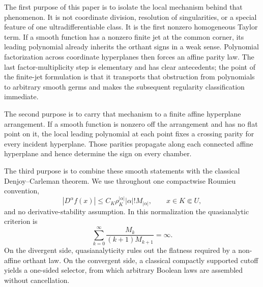 \documentclass[11pt]{article}
\theoremstyle{definition}
\theoremstyle{remark}
\begin{document}
The first purpose of this paper is to isolate the local mechanism behind that phenomenon. It is not coordinate division, resolution of singularities, or a special feature of one ultradifferentiable class. It is the first nonzero homogeneous Taylor term. If a smooth function has a nonzero finite jet at the common corner, its leading polynomial already inherits the orthant signs in a weak sense. Polynomial factorization across coordinate hyperplanes then forces an affine parity law. The last factor-multiplicity step is elementary and has clear antecedents; the point of the finite-jet formulation is that it transports that obstruction from polynomials to arbitrary smooth germs and makes the subsequent regularity classification immediate.

The second purpose is to carry that mechanism to a finite affine hyperplane arrangement. If a smooth function is nonzero off the arrangement and has no flat point on it, the local leading polynomial at each point fixes a crossing parity for every incident hyperplane. Those parities propagate along each connected affine hyperplane and hence determine the sign on every chamber.

The third purpose is to combine these smooth statements with the classical Denjoy--Carleman theorem. We use throughout one compactwise Roumieu convention,
\[
 |D^\alpha f(x)|\le C_K\rho_K^{|\alpha|}|\alpha|!M_{|\alpha|},
 \qquad x\in K\Subset U,
\]
and no derivative-stability assumption. In this normalization the quasianalytic criterion is
\[
 \sum_{k=0}^{\infty}\frac{M_k}{(k+1)M_{k+1}}=\infty.
\]
On the divergent side, quasianalyticity rules out the flatness required by a non-affine orthant law. On the convergent side, a classical compactly supported cutoff yields a one-sided selector, from which arbitrary Boolean laws are assembled without cancellation.
\end{document}
